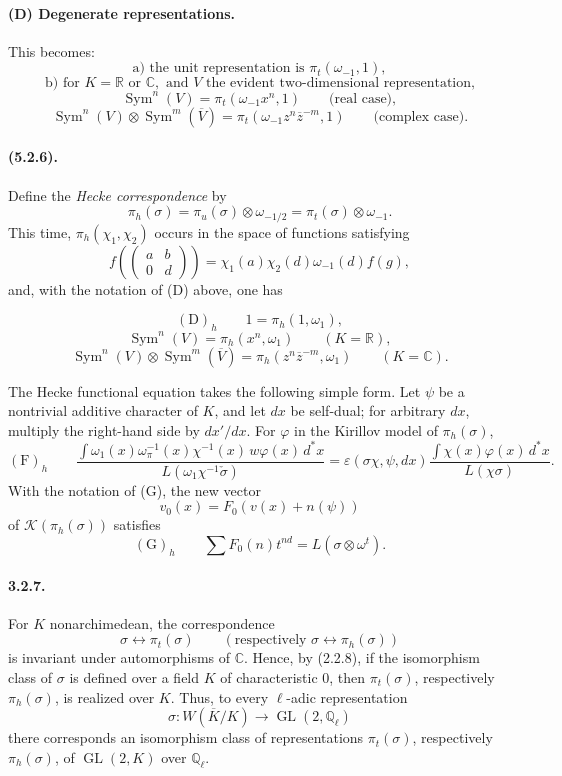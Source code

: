 \documentclass[10pt,a4paper]{article}
\providecommand{\GL}{\operatorname{GL}}
\providecommand{\Sym}{\operatorname{Sym}}
\providecommand{\R}{\mathbb R}
\providecommand{\Q}{\mathbb Q}
\providecommand{\C}{\mathbb C}
\providecommand{\calK}{\mathcal K}
\begin{document}
\paragraph{(D) Degenerate representations.} This becomes:
\[
\text{a) the unit representation is }\pi_t(\omega_{-1},1),
\]
\[
\text{b) for }K=\R\text{ or }\C,\text{ and }V\text{ the evident two-dimensional representation,}
\]
\[
\Sym^n(V)=\pi_t(\omega_{-1}x^n,1)\qquad\text{(real case)},
\]
\[
\Sym^n(V)\otimes\Sym^m(\overline V)
=\pi_t(\omega_{-1}z^n\overline z^{-m},1)
\qquad\text{(complex case)}.
\]

\paragraph{(5.2.6).} Define the \emph{Hecke correspondence} by
\[
\pi_h(\sigma)=\pi_u(\sigma)\otimes\omega_{-1/2}
=\pi_t(\sigma)\otimes\omega_{-1}.
\]
This time, \(\pi_h(\chi_1,\chi_2)\) occurs in the space of functions satisfying
\[
f\!\left(\begin{pmatrix}a&b\\0&d\end{pmatrix}\right)
=\chi_1(a)\chi_2(d)\omega_{-1}(d)f(g),
\]
and, with the notation of (D) above, one has

\clearpage
{}
\hypertarget{authority-47}{}
\[
\mathrm{(D)}_h\qquad
1=\pi_h(1,\omega_1),
\]
\[
\Sym^n(V)=\pi_h(x^n,\omega_1)\qquad(K=\R),
\]
\[
\Sym^n(V)\otimes\Sym^m(\overline V)
=\pi_h(z^n\overline z^{-m},\omega_1)\qquad(K=\C).
\]

The Hecke functional equation takes the following simple form. Let \(\psi\) be a nontrivial additive character of \(K\), and let \(dx\) be self-dual; for arbitrary \(dx\), multiply the right-hand side by \(dx'/dx\). For \(\varphi\) in the Kirillov model of \(\pi_h(\sigma)\),
\[
\mathrm{(F)}_h\qquad
\frac{\displaystyle\int \omega_1(x)\omega_\pi^{-1}(x)\chi^{-1}(x)\,w\varphi(x)\,d^*x}
     {L(\omega_1\chi^{-1}\check\sigma)}
=
\varepsilon(\sigma\chi,\psi,dx)
\frac{\displaystyle\int \chi(x)\varphi(x)\,d^*x}{L(\chi\sigma)}.
\]
With the notation of (G), the new vector
\[
v_0(x)=F_0(v(x)+n(\psi))
\]
of \(\calK(\pi_h(\sigma))\) satisfies
\[
\mathrm{(G)}_h\qquad
\sum F_0(n)t^{nd}=L(\sigma\otimes\omega^t).
\]

\paragraph{3.2.7.} For \(K\) nonarchimedean, the correspondence
\[
\sigma\longleftrightarrow\pi_t(\sigma)\qquad(\text{respectively }\sigma\longleftrightarrow\pi_h(\sigma))
\]
is invariant under automorphisms of \(\C\). Hence, by (2.2.8), if the isomorphism class of \(\sigma\) is defined over a field \(K\) of characteristic \(0\), then \(\pi_t(\sigma)\), respectively \(\pi_h(\sigma)\), is realized over \(K\). Thus, to every \(\ell\)-adic representation
\[
\sigma:W(\overline K/K)\longrightarrow\GL(2,\Q_\ell)
\]
there corresponds an isomorphism class of representations \(\pi_t(\sigma)\), respectively \(\pi_h(\sigma)\), of \(\GL(2,K)\) over \(\Q_\ell\).
\end{document}
